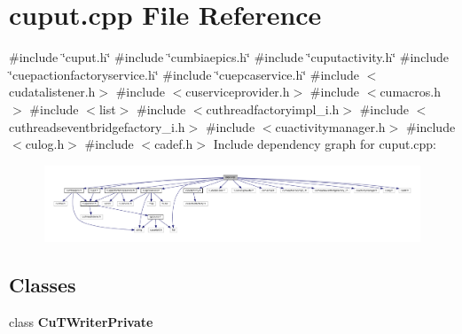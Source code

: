 \section{cuput.\+cpp File Reference}
\label{cuput_8cpp}
{\ttfamily \#include \char`\"{}cuput.\+h\char`\"{}}\newline
{\ttfamily \#include \char`\"{}cumbiaepics.\+h\char`\"{}}\newline
{\ttfamily \#include \char`\"{}cuputactivity.\+h\char`\"{}}\newline
{\ttfamily \#include \char`\"{}cuepactionfactoryservice.\+h\char`\"{}}\newline
{\ttfamily \#include \char`\"{}cuepcaservice.\+h\char`\"{}}\newline
{\ttfamily \#include $<$cudatalistener.\+h$>$}\newline
{\ttfamily \#include $<$cuserviceprovider.\+h$>$}\newline
{\ttfamily \#include $<$cumacros.\+h$>$}\newline
{\ttfamily \#include $<$list$>$}\newline
{\ttfamily \#include $<$cuthreadfactoryimpl\+\_\+i.\+h$>$}\newline
{\ttfamily \#include $<$cuthreadseventbridgefactory\+\_\+i.\+h$>$}\newline
{\ttfamily \#include $<$cuactivitymanager.\+h$>$}\newline
{\ttfamily \#include $<$culog.\+h$>$}\newline
{\ttfamily \#include $<$cadef.\+h$>$}\newline
Include dependency graph for cuput.\+cpp\+:\nopagebreak
\begin{figure}[H]
\begin{center}
\leavevmode
\includegraphics[width=350pt]{cuput_8cpp__incl}
\end{center}
\end{figure}
\subsection*{Classes}
\begin{DoxyCompactItemize}
\item 
class \textbf{ Cu\+T\+Writer\+Private}
\end{DoxyCompactItemize}
